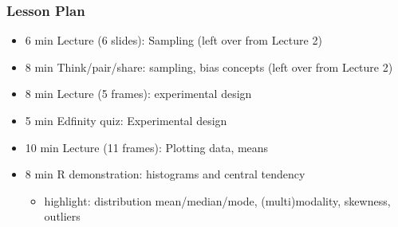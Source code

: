 \begin{frame}
    \frametitle{Lesson Plan}
    \begin{itemize}
        \item 6 min Lecture (6 slides): Sampling (left over from Lecture 2)
        \item 8 min Think/pair/share: sampling, bias concepts (left over from Lecture 2)
        \item 8 min Lecture (5 frames): experimental design
        \item 5 min Edfinity quiz: Experimental design
        \item 10 min Lecture (11 frames): Plotting data, means
        \item 8 min R demonstration: histograms and central tendency
        \begin{itemize}
            \item  highlight: distribution mean/median/mode, (multi)modality, skewness, outliers
        \end{itemize}


     \end{itemize}
\end{frame}

